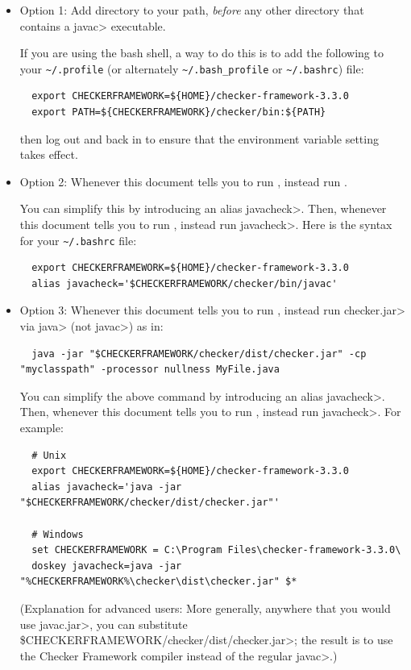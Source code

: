 \begin{itemize}
  \item
    Option 1:
    Add directory
     to your path, \emph{before} any other
    directory that contains a \<javac> executable.

    If you are
    using the bash shell, a way to do this is to add the following to your
    \verb|~/.profile| (or alternately \verb|~/.bash_profile| or \verb|~/.bashrc|) file:
\begin{Verbatim}
  export CHECKERFRAMEWORK=${HOME}/checker-framework-3.3.0
  export PATH=${CHECKERFRAMEWORK}/checker/bin:${PATH}
\end{Verbatim}
    then log out and back in to ensure that the environment variable
    setting takes effect.

  \item
    \begin{sloppypar}
    Option 2:
    Whenever this document tells you to run ,
    instead run .
    \end{sloppypar}

    You can simplify this by introducing an alias \<javacheck>.  Then,
    whenever this document tells you to run , instead run
    \<javacheck>.  Here is the syntax for your
    \verb|~/.bashrc| file:
\begin{Verbatim}
  export CHECKERFRAMEWORK=${HOME}/checker-framework-3.3.0
  alias javacheck='$CHECKERFRAMEWORK/checker/bin/javac'
\end{Verbatim}

   \item
   Option 3:
   Whenever this document tells you to run , instead
   run \<checker.jar> via \<java> (not \<javac>) as in:

\begin{Verbatim}
  java -jar "$CHECKERFRAMEWORK/checker/dist/checker.jar" -cp "myclasspath" -processor nullness MyFile.java
\end{Verbatim}

    You can simplify the above command by introducing an alias
    \<javacheck>.  Then, whenever this document tells you to run
    , instead run \<javacheck>.  For example:

\begin{Verbatim}
  # Unix
  export CHECKERFRAMEWORK=${HOME}/checker-framework-3.3.0
  alias javacheck='java -jar "$CHECKERFRAMEWORK/checker/dist/checker.jar"'

  # Windows
  set CHECKERFRAMEWORK = C:\Program Files\checker-framework-3.3.0\
  doskey javacheck=java -jar "%CHECKERFRAMEWORK%\checker\dist\checker.jar" $*
\end{Verbatim}

  (Explanation for advanced users:
  More generally, anywhere that you would use \<javac.jar>, you can substitute
  \<\$CHECKERFRAMEWORK/checker/dist/checker.jar>;
  the result is to use the Checker
  Framework compiler instead of the regular \<javac>.)

\end{itemize}



